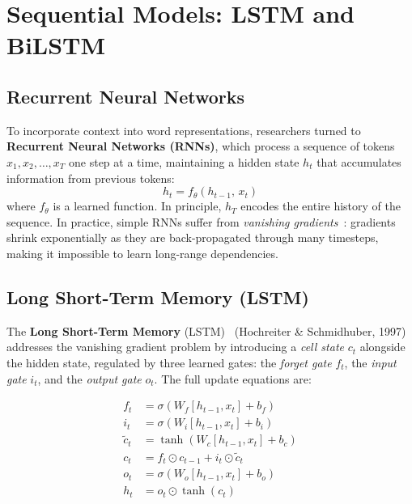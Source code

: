 \section{Sequential Models: LSTM and BiLSTM}
\label{sec:lstm}

\subsection{Recurrent Neural Networks}

To incorporate context into word representations, researchers turned to
\textbf{Recurrent Neural Networks (RNNs)}, which process a sequence of tokens
$x_1, x_2, \ldots, x_T$ one step at a time, maintaining a hidden state $h_t$
that accumulates information from previous tokens:
\begin{equation}
  h_t = f_\theta(h_{t-1},\, x_t)
\end{equation}
where $f_\theta$ is a learned function. In principle, $h_T$ encodes the entire
history of the sequence. In practice, simple RNNs suffer from
\emph{vanishing gradients}~\cite{bengio1994learning}: gradients shrink
exponentially as they are back-propagated through many timesteps, making it
impossible to learn long-range dependencies.

\subsection{Long Short-Term Memory (LSTM)}
\label{subsec:lstm}

The \textbf{Long Short-Term Memory} (LSTM)~\cite{hochreiter1997lstm}
(Hochreiter \& Schmidhuber, 1997) addresses the vanishing gradient problem by
introducing a \emph{cell state} $c_t$ alongside the hidden state, regulated by
three learned gates: the \emph{forget gate} $f_t$, the \emph{input gate} $i_t$,
and the \emph{output gate} $o_t$. The full update equations are:

\begin{align}
  f_t          &= \sigma(W_f [h_{t-1}, x_t] + b_f)             \label{eq:forget}    \\
  i_t          &= \sigma(W_i [h_{t-1}, x_t] + b_i)             \label{eq:inputgate} \\
  \tilde{c}_t  &= \tanh(W_c [h_{t-1}, x_t] + b_c)              \label{eq:candidate} \\
  c_t          &= f_t \odot c_{t-1} + i_t \odot \tilde{c}_t    \label{eq:cell}      \\
  o_t          &= \sigma(W_o [h_{t-1}, x_t] + b_o)             \label{eq:outgate}   \\
  h_t          &= o_t \odot \tanh(c_t)                          \label{eq:hidden}
\end{align}

